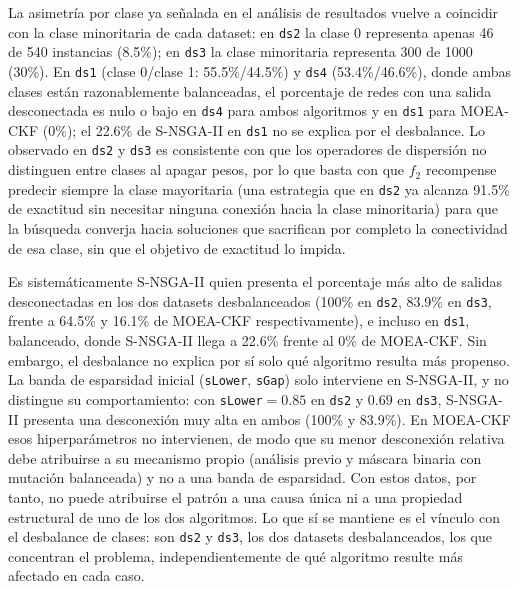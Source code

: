 La asimetría por clase ya señalada en el análisis de resultados vuelve a coincidir con la clase minoritaria de cada dataset: en \texttt{ds2} la clase 0 representa apenas 46 de 540 instancias (8.5\%); en \texttt{ds3} la clase minoritaria representa 300 de 1000 (30\%). En \texttt{ds1} (clase 0/clase 1: 55.5\%/44.5\%) y \texttt{ds4} (53.4\%/46.6\%), donde ambas clases están razonablemente balanceadas, el porcentaje de redes con una salida desconectada es nulo o bajo en \texttt{ds4} para ambos algoritmos y en \texttt{ds1} para MOEA-CKF (0\%); el 22.6\% de S-NSGA-II en \texttt{ds1} no se explica por el desbalance. Lo observado en \texttt{ds2} y \texttt{ds3} es consistente con que los operadores de dispersión no distinguen entre clases al apagar pesos, por lo que basta con que $f_2$ recompense predecir siempre la clase mayoritaria (una estrategia que en \texttt{ds2} ya alcanza 91.5\% de exactitud sin necesitar ninguna conexión hacia la clase minoritaria) para que la búsqueda converja hacia soluciones que sacrifican por completo la conectividad de esa clase, sin que el objetivo de exactitud lo impida.

Es sistemáticamente S-NSGA-II quien presenta el porcentaje más alto de salidas desconectadas en los dos datasets desbalanceados (100\% en \texttt{ds2}, 83.9\% en \texttt{ds3}, frente a 64.5\% y 16.1\% de MOEA-CKF respectivamente), e incluso en \texttt{ds1}, balanceado, donde S-NSGA-II llega a 22.6\% frente al 0\% de MOEA-CKF. Sin embargo, el desbalance no explica por sí solo qué algoritmo resulta más propenso. La banda de esparsidad inicial (\texttt{sLower}, \texttt{sGap}) solo interviene en S-NSGA-II, y no distingue su comportamiento: con \texttt{sLower}$=0.85$ en \texttt{ds2} y $0.69$ en \texttt{ds3}, S-NSGA-II presenta una desconexión muy alta en ambos (100\% y 83.9\%). En MOEA-CKF esos hiperparámetros no intervienen, de modo que su menor desconexión relativa debe atribuirse a su mecanismo propio (análisis previo y máscara binaria con mutación balanceada) y no a una banda de esparsidad. Con estos datos, por tanto, no puede atribuirse el patrón a una causa única ni a una propiedad estructural de uno de los dos algoritmos. Lo que sí se mantiene es el vínculo con el desbalance de clases: son \texttt{ds2} y \texttt{ds3}, los dos datasets desbalanceados, los que concentran el problema, independientemente de qué algoritmo resulte más afectado en cada caso.

